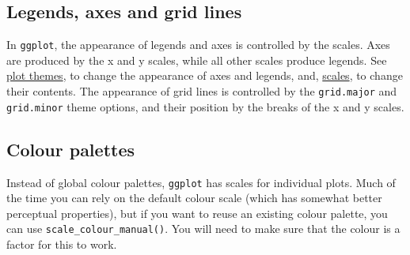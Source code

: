 \subsection{Legends, axes and grid lines}

In \texttt{ggplot}, the appearance of legends and axes is controlled by
the scales. Axes are produced by the x and y scales, while all other
scales produce legends. See \hyperref[sec:themes]{plot themes}, to
change the appearance of axes and legends, and,
\hyperref[sec:guides]{scales}, to change their contents. The appearance
of grid lines is controlled by the \texttt{grid.major} and
\texttt{grid.minor} theme options, and their position by the breaks of
the x and y scales.

\subsection{Colour palettes}

Instead of global colour palettes, \texttt{ggplot} has scales for
individual plots. Much of the time you can rely on the default colour
scale (which has somewhat better perceptual properties), but if you want
to reuse an existing colour palette, you can use
\texttt{scale\_colour\_manual()}. You will need to make sure that the
colour is a factor for this to work. 

\begin{Shaded}
\begin{Highlighting}[]
\NormalTok{(}\NormalTok{(}\NormalTok{))}
\NormalTok{(}\NormalTok{:}\NormalTok{, }\NormalTok{:}\NormalTok{, } \NormalTok{:}\NormalTok{, } \NormalTok{, } \NormalTok{)}

\NormalTok{(}\NormalTok{:}\NormalTok{, }\NormalTok{:}\NormalTok{, } \NormalTok{(}\NormalTok{:}\NormalTok{), } \NormalTok{(}\NormalTok{))}
\NormalTok{() +}\StringTok{ }\NormalTok{(} \NormalTok{(}\NormalTok{))}
\end{Highlighting}
\end{Shaded}

